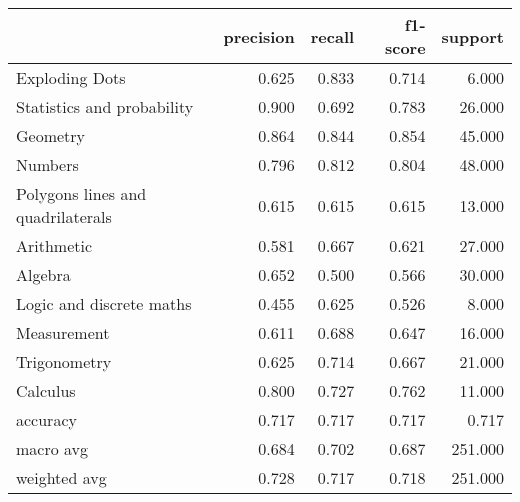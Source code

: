 \begin{tabular}{lrrrr}
\toprule
{} &  precision &  recall &  f1-score &  support \\
\midrule
Exploding Dots                    &      0.625 &   0.833 &     0.714 &    6.000 \\
Statistics and probability        &      0.900 &   0.692 &     0.783 &   26.000 \\
Geometry                          &      0.864 &   0.844 &     0.854 &   45.000 \\
Numbers                           &      0.796 &   0.812 &     0.804 &   48.000 \\
Polygons lines and quadrilaterals &      0.615 &   0.615 &     0.615 &   13.000 \\
Arithmetic                        &      0.581 &   0.667 &     0.621 &   27.000 \\
Algebra                           &      0.652 &   0.500 &     0.566 &   30.000 \\
Logic and discrete maths          &      0.455 &   0.625 &     0.526 &    8.000 \\
Measurement                       &      0.611 &   0.688 &     0.647 &   16.000 \\
Trigonometry                      &      0.625 &   0.714 &     0.667 &   21.000 \\
Calculus                          &      0.800 &   0.727 &     0.762 &   11.000 \\
accuracy                          &      0.717 &   0.717 &     0.717 &    0.717 \\
macro avg                         &      0.684 &   0.702 &     0.687 &  251.000 \\
weighted avg                      &      0.728 &   0.717 &     0.718 &  251.000 \\
\bottomrule
\end{tabular}
